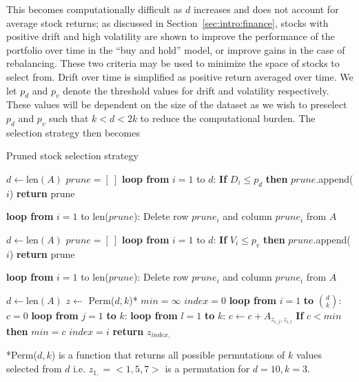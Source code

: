 \noindent This becomes computationally difficult as $d$ increases and does not 
account for average stock returns; as discussed in 
Section~\ref{sec:intro:finance}, 
stocks with positive drift and high volatility are shown to improve the 
performance of the portfolio over time in the ``buy and hold'' model, or 
improve gains in the case of rebalancing. These two criteria may be used to 
minimize the space of stocks to select from. Drift over time is simplified as 
positive return averaged over time. We let $p_d$ and $p_v$ denote the threshold 
values for drift and volatility respectively. These values will be dependent on 
the size of the dataset as we wish to preselect $p_d$ and $p_v$ such that 
$k<d<2k$ to reduce the computational burden. The selection strategy then becomes

\tablespacing
\begin{algorithm}[H]
	\caption{Pruned stock selection strategy}\label{euclid}
	\begin{algorithmic}[1]
		
		\State $d \gets \text{len}(A)$
		\State $prune = [\ ]$
		\State \textbf{loop from} $i = 1$ to $d$:
		\State \indent \textbf{If} $D_i \leq p_d$ \textbf{then} 
		$prune$.append($i$)
		\State \textbf{return} prune
		\EndFunction
		
		\State \textbf{loop from} $i=1$ to len($prune$):
		\State \indent Delete row $prune_i$ and column $prune_i$ from $A$
		
		\State $d \gets \text{len}(A)$
		\State $prune = [\ ]$
		\State \textbf{loop from} $i = 1$ to $d$:
		\State \indent \textbf{If} $V_i \leq p_v$ \textbf{then} 
		$prune$.append($i$)
		\State \textbf{return} prune
		\EndFunction
		
		\State \textbf{loop from} $i=1$ to len($prune$):
		\State \indent Delete row $prune_i$ and column $prune_i$ from $A$
		
		\State $d \gets \text{len}(A)$
		\State $z \gets$ Perm($d,k$)*
		\State $min = \infty$
		\State $index = 0$
		\State \textbf{loop from} $i=1$ \textbf{to} $d \choose k$:
		\State \indent $c = 0$
		\State \indent \textbf{loop from} $j = 1$ \textbf{to} $k$:
		\State \indent \indent \textbf{loop from} $l=1$ \textbf{to} $k$:
		\State \indent \indent \indent $c \gets c+A_{z_{i,j},z_{i,l}}$
		\State \indent \textbf{If} $c < min$ \textbf{then}
		\State \indent \indent $min = c$
		\State \indent \indent $index = i$
		\State \textbf{return} $z_{index,}$
		\EndFunction
		\EndProcedure
	\end{algorithmic}
	*Perm($d,k$) is a function that returns all possible permutations 
	of $k$ values selected from $d$ i.e. $z_{1,}=<1,5,7>$ is a permutation for 
	$d=10,k=3$.
\end{algorithm}
\bodyspacing